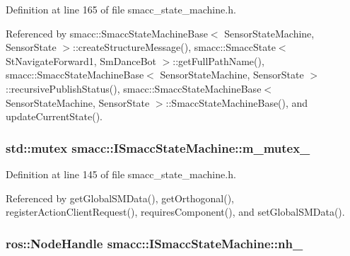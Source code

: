 Definition at line 165 of file smacc\+\_\+state\+\_\+machine.\+h.



Referenced by smacc\+::\+Smacc\+State\+Machine\+Base$<$ Sensor\+State\+Machine, Sensor\+State $>$\+::create\+Structure\+Message(), smacc\+::\+Smacc\+State$<$ St\+Navigate\+Forward1, Sm\+Dance\+Bot $>$\+::get\+Full\+Path\+Name(), smacc\+::\+Smacc\+State\+Machine\+Base$<$ Sensor\+State\+Machine, Sensor\+State $>$\+::recursive\+Publish\+Status(), smacc\+::\+Smacc\+State\+Machine\+Base$<$ Sensor\+State\+Machine, Sensor\+State $>$\+::\+Smacc\+State\+Machine\+Base(), and update\+Current\+State().

\subsubsection[{\texorpdfstring{m\+\_\+mutex\+\_\+}{m_mutex_}}]{\setlength{\rightskip}{0pt plus 5cm}std\+::mutex smacc\+::\+I\+Smacc\+State\+Machine\+::m\+\_\+mutex\+\_\+\hspace{0.3cm}{\ttfamily [private]}}\hypertarget{classsmacc_1_1ISmaccStateMachine_a0eecb19258e0ec026029c7755dbb94d7}{}\label{classsmacc_1_1ISmaccStateMachine_a0eecb19258e0ec026029c7755dbb94d7}


Definition at line 145 of file smacc\+\_\+state\+\_\+machine.\+h.



Referenced by get\+Global\+S\+M\+Data(), get\+Orthogonal(), register\+Action\+Client\+Request(), requires\+Component(), and set\+Global\+S\+M\+Data().

\subsubsection[{\texorpdfstring{nh\+\_\+}{nh_}}]{\setlength{\rightskip}{0pt plus 5cm}ros\+::\+Node\+Handle smacc\+::\+I\+Smacc\+State\+Machine\+::nh\+\_\+\hspace{0.3cm}{\ttfamily [private]}}\hypertarget{classsmacc_1_1ISmaccStateMachine_ad8877bcca9dbb345fe72cca839c93dd3}{}\label{classsmacc_1_1ISmaccStateMachine_ad8877bcca9dbb345fe72cca839c93dd3}



